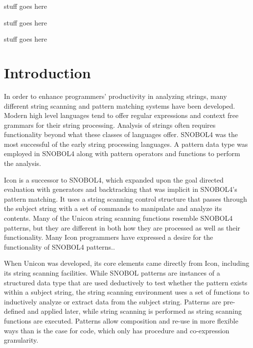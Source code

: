 \documentclass{article}
\begin{document}
stuff goes here
\pagebreak

stuff goes here
\pagebreak

\linespread{1}
\tableofcontents

\pagebreak

stuff goes here
\pagebreak

\listoftables
\pagebreak

\section{Introduction}
In order to enhance programmers' productivity in analyzing strings, many different string scanning and pattern matching systems have been developed.  Modern high level languages tend to offer regular expressions and context free grammars for their string processing.  Analysis of strings often requires functionality beyond what these classes of languages offer.  SNOBOL4 was the most successful of the early string processing languages. \cite{Snobol, Gaikaiwari2005}  A pattern data type was employed in SNOBOL4 along with pattern operators and functions to perform the analysis.

Icon is a successor to SNOBOL4, which expanded upon the goal directed evaluation with generators and backtracking that was implicit in SNOBOL4's pattern matching.\cite{GriswoldIcon, Gaikaiwari2005}  It uses a string scanning control structure that passes through the subject string with a set of commands to manipulate and analyze its contents.  Many of the Unicon string scanning functions resemble SNOBOL4 patterns, but they are different in both how they are processed as well as their functionality.  Many Icon programmers have expressed a desire for the functionality of SNOBOL4 patterns.\cite{Griswold1980}.

When Unicon was developed, its core elements came directly from Icon, including its string scanning facilities.\cite{JefferyUnicon}  While SNOBOL patterns are instances of a structured data type that are used deductively to test whether the pattern exists within a subject string, the string scanning environment uses a set of functions to inductively analyze or extract data from the subject string.  Patterns are pre-defined and applied later, while string scanning is performed as string scanning functions are executed.  Patterns allow composition and re-use in more flexible ways than is the case for code, which only has procedure and co-expression granularity.
\end{document}
